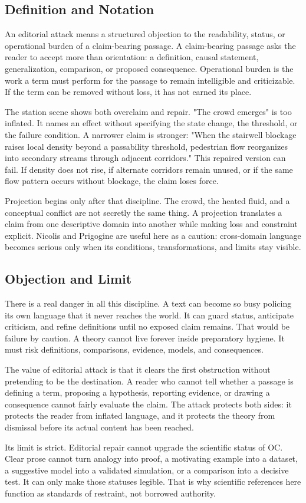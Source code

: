\documentclass[11pt,a4paper,openany]{book}
\begin{document}
\subsection{Definition and Notation}
An editorial attack means a structured objection to the readability, status, or operational burden of a claim-bearing passage. A claim-bearing passage asks the reader to accept more than orientation: a definition, causal statement, generalization, comparison, or proposed consequence. Operational burden is the work a term must perform for the passage to remain intelligible and criticizable. If the term can be removed without loss, it has not earned its place. \cite{landau_stat_physics,prigogine_dissipative}\par
The station scene shows both overclaim and repair. "The crowd emerges" is too inflated. It names an effect without specifying the state change, the threshold, or the failure condition. A narrower claim is stronger: "When the stairwell blockage raises local density beyond a passability threshold, pedestrian flow reorganizes into secondary streams through adjacent corridors." This repaired version can fail. If density does not rise, if alternate corridors remain unused, or if the same flow pattern occurs without blockage, the claim loses force.\par
Projection begins only after that discipline. The crowd, the heated fluid, and a conceptual conflict are not secretly the same thing. A projection translates a claim from one descriptive domain into another while making loss and constraint explicit. Nicolis and Prigogine are useful here as a caution: cross-domain language becomes serious only when its conditions, transformations, and limits stay visible.\par
\subsection{Objection and Limit}
There is a real danger in all this discipline. A text can become so busy policing its own language that it never reaches the world. It can guard status, anticipate criticism, and refine definitions until no exposed claim remains. That would be failure by caution. A theory cannot live forever inside preparatory hygiene. It must risk definitions, comparisons, evidence, models, and consequences. \cite{landau_stat_physics,prigogine_dissipative}\par
The value of editorial attack is that it clears the first obstruction without pretending to be the destination. A reader who cannot tell whether a passage is defining a term, proposing a hypothesis, reporting evidence, or drawing a consequence cannot fairly evaluate the claim. The attack protects both sides: it protects the reader from inflated language, and it protects the theory from dismissal before its actual content has been reached.\par
Its limit is strict. Editorial repair cannot upgrade the scientific status of OC. Clear prose cannot turn analogy into proof, a motivating example into a dataset, a suggestive model into a validated simulation, or a comparison into a decisive test. It can only make those statuses legible. That is why scientific references here function as standards of restraint, not borrowed authority.\par
\end{document}

